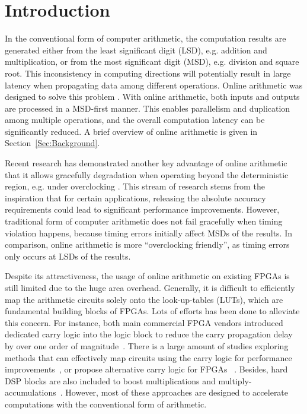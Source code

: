 \documentclass[conference]{IEEEtran}
\begin{document}
%



\section{Introduction}\label{Sec:Intro}
In the conventional form of computer arithmetic, the computation results are generated either from the least significant digit (LSD), e.g. addition and multiplication, or from the most significant digit (MSD), e.g. division and square root. This inconsistency in computing directions will potentially result in large latency when propagating data among different operations. Online arithmetic was designed to solve this problem \cite{Ercegovac_OnlineOverview,Ercegovac_Book}. With online arithmetic, both inputs and outputs are processed in a MSD-first manner. This enables parallelism and duplication among multiple operations, and the overall computation latency can be significantly reduced. A brief overview of online arithmetic is given in Section~\ref{Sec:Background}.

Recent research has demonstrated another key advantage of online arithmetic that it allows gracefully degradation when operating beyond the deterministic region, e.g. under overclocking \cite{SKDAC14}. This stream of research stems from the inspiration that for certain applications, releasing the absolute accuracy requirements could lead to significant performance improvements. However, traditional form of computer arithmetic does not fail gracefully when timing violation happens, because timing errors initially affect MSDs of the results. In comparison, online arithmetic is more ``overclocking friendly'', as timing errors only occurs at LSDs of the results.

Despite its attractiveness, the usage of online arithmetic on existing FPGAs is still limited due to the huge area overhead. Generally, it is difficult to efficiently map the arithmetic circuits solely onto the look-up-tables (LUTs), which are fundamental building blocks of FPGAs. Lots of efforts has been done to alleviate this concern. For instance, both main commercial FPGA vendors introduced dedicated carry logic into the logic block to reduce the carry propagation delay by over one order of magnitude~\cite{Virtex6}. There is a large amount of studies exploring methods that can effectively map circuits using the carry logic for performance improvements~\cite{FPL10_FPGA_CarryChain,Prefix_CarryChain}, or propose alternative carry logic for FPGAs~\cite{FPGA_CarryChain_New1,FPGA_CarryChain_New2} . Besides, hard DSP blocks are also included to boost multiplications and multiply-accumulations~\cite{XilinxDSP}. However, most of these approaches are designed to accelerate computations with the conventional form of arithmetic.
\end{document}
